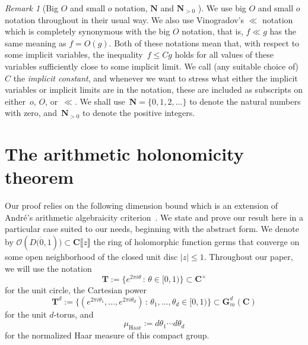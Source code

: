 \documentclass[10pt]{amsart}
\def\NwithzeroB{\mathbf{N}}
\def\NwithzeroA{\NwithzeroB}
\def\NwithoutzeroA{\mathbf{N}_{> 0}}
\def\T{\mathbf{T}}
\renewcommand\mathbb{\mathbf}
\theoremstyle{remark}
\newtheorem{remark}[subsubsection]{Remark}
\numberwithin{equation}{subsection}
\def\C{\mathbf{C}}
\begin{document}
\begin{remark}[Big $O$ and small $o$ notation, $\NwithzeroA$ and $\NwithoutzeroA$ ] \label{rem:notation}
We use big $O$ and small $o$ notation throughout in their usual way.
We also use Vinogradov's $\ll$ notation which is completely synonymous with the big $O$ notation, that is, $f \ll g$ has
the same meaning as $f = O(g)$. Both of these notations mean that, with respect to some implicit variables, 
the inequality~$f \le Cg$ holds for all values of these variables sufficiently close to some implicit limit.
We call (any suitable choice of) $C$ the \emph{implicit constant}, and whenever we want to stress what either the implicit
variables or implicit limits are in the notation, these are included as subscripts on either~$o$, $O$, or~$\ll$.
We shall use~$\NwithzeroB = \{0,1,2, \ldots\}$ to denote the natural numbers with zero,
and~$\NwithoutzeroA$  to denote the positive integers.
\end{remark}


\section{The arithmetic holonomicity theorem} \label{holonomy abstraction}


Our proof relies on the following dimension bound which is an extension of
Andr\'e's arithmetic algebraicity criterion~\cite[Th\'eor\`eme~5.4.3]{Andre}. We state and prove our result here in a
particular case suited to our needs, beginning with the abstract form. We denote by $\mathcal{O}(\overline{D(0,1})) \subset \C \llbracket z \rrbracket$ the ring of holomorphic function germs that converge on some open neighborhood of the closed unit disc $|z| \leq 1$. Throughout our paper, we will use the notation
$$
\T  := \{ e^{2 \pi i \theta} \, : \, \theta \in [0,1) \} \subset \C^{\times}
$$
for the unit circle,  the Cartesian power
$$
\T^d := \{ (e^{2\pi i \theta_1}, \ldots, e^{2\pi i \theta_d}) \, : \, \theta_1, \ldots, \theta_d \in [0,1) \} \subset \mathbb{G}_m^d(\C)
$$
for the unit  $d$-torus, and
$$
\mu_{\mathrm{Haar}} := d\theta_1 \cdots d\theta_d
$$
for the normalized Haar measure of this compact group.
\end{document}
